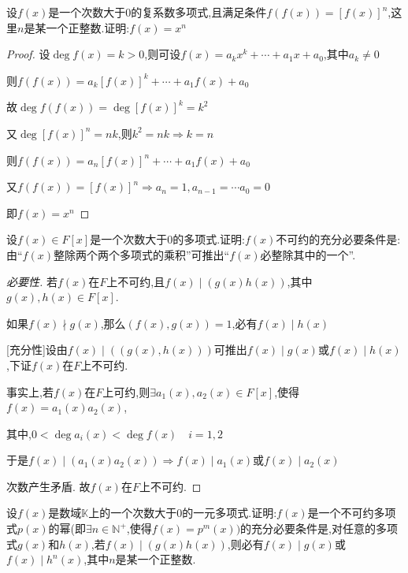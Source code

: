\begin{example}
    设$f(x)$是一个次数大于0的复系数多项式,且满足条件$f(f(x))=[f(x)]^n$,这里$n$是某一个正整数.证明:$f(x)=x^n$
\end{example}

\begin{proof}
    设$\deg f(x)=k>0$,则可设$f(x)=a_k x^k+\cdots + a_1 x+a_0$,其中$a_k\ne 0$

    则$f(f(x))=a_k [f(x)]^k+\cdots + a_1 f(x)+a_0$

    故$\deg f(f(x))=\deg [f(x)]^k=k^2$

    又$\deg [f(x)]^n=nk$,则$k^2=nk\Longrightarrow k=n$

    则$f(f(x))=a_n [f(x)]^n+\cdots + a_1 f(x)+a_0$

    又$f(f(x))=[f(x)]^n\Longrightarrow a_n=1,a_{n-1}=\cdots a_0=0$

    即$f(x)=x^n$
\end{proof}

\begin{example}
    设$f(x)\in F[x]$是一个次数大于0的多项式.证明:$f(x)$不可约的充分必要条件是:由“$f(x)$整除两个两个多项式的乘积”可推出“$f(x)$必整除其中的一个”. 
\end{example}

\begin{proof}
    [必要性]若$f(x)$在$F$上不可约,且$f(x)\mid (g(x)h(x))$,其中$g(x),h(x)\in F[x]$. 

    如果$f(x)\nmid g(x)$,那么$(f(x),g(x))=1$,必有$f(x)\mid h(x)$

    [充分性]设由$f(x)\mid ((g(x),h(x)))$可推出$f(x)\mid g(x)$或$f(x)\mid h(x)$,下证$f(x)$在$F$上不可约. 

    事实上,若$f(x)$在$F$上可约,则$\exists a_1(x),a_2(x)\in F[x]$,使得$f(x)=a_1(x)a_2(x)$,
    
    其中,$0<\deg a_i(x)< \deg f(x)\quad i=1,2$

    于是$f(x)\mid (a_1(x)a_2(x))\Longrightarrow f(x)\mid a_1(x)$或$f(x)\mid a_2(x)$

    次数产生矛盾. 故$f(x)$在$F$上不可约. 
\end{proof}

\begin{example}
    设$f(x)$是数域$\mathbb{K}$上的一个次数大于0的一元多项式.证明:$f(x)$是一个不可约多项式$p(x)$的幂(即$\exists n\in \mathbb{N}^+$,使得$f(x)=p^m(x))$的充分必要条件是,对任意的多项式$g(x)$和$h(x)$,若$f(x)\mid (g(x)h(x))$,则必有$f(x)\mid g(x)$或$f(x)\mid h^n(x)$,其中$n$是某一个正整数.
\end{example}

